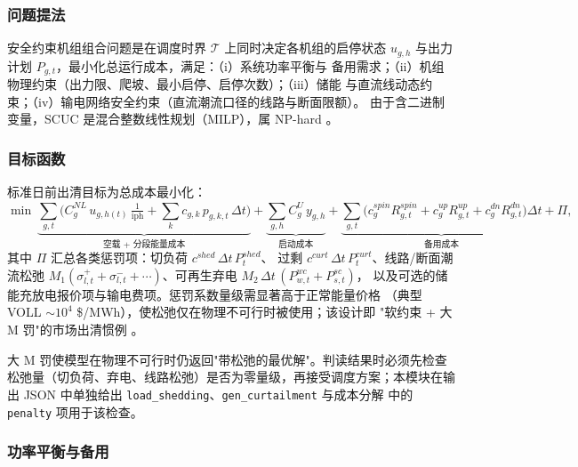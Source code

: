 \subsubsection{问题提法}

\begin{definition}[SCUC]
安全约束机组组合问题是在调度时界 $\mathcal T$ 上同时决定各机组的启停状态
$u_{g,h}$ 与出力计划 $P_{g,t}$，最小化总运行成本，满足：（i）系统功率平衡与
备用需求；（ii）机组物理约束（出力限、爬坡、最小启停、启停次数）；（iii）储能
与直流线动态约束；（iv）输电网络安全约束（直流潮流口径的线路与断面限额）。
由于含二进制变量，SCUC 是混合整数线性规划（MILP），属 NP-hard
\cite{wood2013}。
\end{definition}

\subsubsection{目标函数}

标准日前出清目标为总成本最小化：
\begin{equation}
\min\ \underbrace{\sum_{g,t}\Big(C^{NL}_g\,u_{g,h(t)}\,\tfrac{1}{\mathrm{iph}}
  + \sum_{k} c_{g,k}\,p_{g,k,t}\,\Delta t\Big)}_{\text{空载 + 分段能量成本}}
+ \underbrace{\sum_{g,h} C^U_g\, y_{g,h}}_{\text{启动成本}}
+ \underbrace{\sum_{g,t}\big(c^{spin}_g R^{spin}_{g,t}+c^{up}_g R^{up}_{g,t}
  +c^{dn}_g R^{dn}_{g,t}\big)\Delta t}_{\text{备用成本}}
+ \Pi,
\label{eq:scuc-obj}
\end{equation}
其中 $\Pi$ 汇总各类惩罚项：切负荷 $c^{shed}\,\Delta t\,P^{shed}_t$、
过剩 $c^{curt}\,\Delta t\,P^{curt}_t$、线路/断面潮流松弛 $M_1(\sigma^+_{l,t}
+\sigma^-_{l,t}+\cdots)$、可再生弃电 $M_2\,\Delta t\,(P^{wc}_{w,t}+P^{sc}_{s,t})$，
以及可选的储能充放电报价项与输电费项。惩罚系数量级需显著高于正常能量价格
（典型 VOLL $\sim 10^4$ \$/MWh），使松弛仅在物理不可行时被使用；该设计即
"软约束 + 大 M 罚"的市场出清惯例 \cite{southern2025}。

\begin{remark}[惩罚口径的诚实声明]
大 M 罚使模型在物理不可行时仍返回"带松弛的最优解"。判读结果时必须先检查
松弛量（切负荷、弃电、线路松弛）是否为零量级，再接受调度方案；本模块在输出
JSON 中单独给出 \texttt{load\_shedding}、\texttt{gen\_curtailment} 与成本分解
中的 \texttt{penalty} 项用于该检查。
\end{remark}

\subsubsection{功率平衡与备用}

